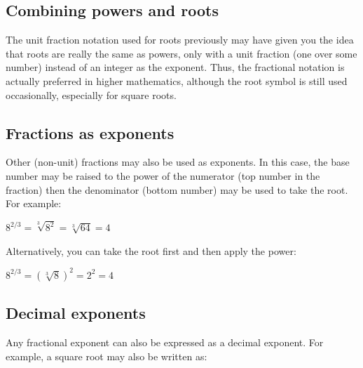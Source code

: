 \subsection{Combining powers and roots}
\label{sss:comb-cd9b}




The unit fraction notation used for roots previously may have given you the idea that
roots are really the same as powers, only with a unit fraction (one over some number)
instead of an integer as the exponent. Thus, the fractional notation is actually preferred
in higher mathematics, although the root symbol is still used occasionally, especially for
square roots.




\subsection{Fractions as exponents}
\label{sss:frac-72ec}




Other (non-unit) fractions may also be used as exponents. In this case, the base number
may be raised to the power of the numerator (top number in the fraction) then the
denominator (bottom number) may be used to take the root. For example:



$8^{2/3} = \sqrt[3]{8^2} = \sqrt[3]{64} = 4$



Alternatively, you can take the root first and then apply the power:



$8^{2/3} = (\sqrt[3]{8})^2 = 2^2 = 4$




\subsection{Decimal exponents}
\label{sss:deci-e3b0}




Any fractional exponent can also be expressed as a decimal exponent. For example, a square
root may also be written as:




